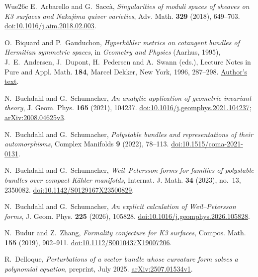\begin{thebibliography}{Wue26c}
E.~Arbarello and G.~Sacc\`a,
\textit{Singularities of moduli spaces of sheaves on K3 surfaces and
Nakajima quiver varieties}, Adv. Math. \textbf{329} (2018), 649--703.
\href{https://doi.org/10.1016/j.aim.2018.02.003}{doi:10.1016/j.aim.2018.02.003}.

O.~Biquard and P.~Gauduchon,
\textit{Hyperk\"ahler metrics on cotangent bundles of Hermitian symmetric spaces},
in \textit{Geometry and Physics} (Aarhus, 1995),
J.~E.~Andersen, J.~Dupont, H.~Pedersen and A.~Swann (eds.),
Lecture Notes in Pure and Appl. Math. \textbf{184},
Marcel Dekker, New York, 1996, 287--298.
\href{https://webusers.imj-prg.fr/~olivier.biquard/hs.pdf}{Author's text}.

N.~Buchdahl and G.~Schumacher,
\textit{An analytic application of geometric invariant theory},
J. Geom. Phys. \textbf{165} (2021), 104237.
\href{https://doi.org/10.1016/j.geomphys.2021.104237}{doi:10.1016/j.geomphys.2021.104237};
\href{https://arxiv.org/abs/2008.04625v3}{arXiv:2008.04625v3}.

N.~Buchdahl and G.~Schumacher,
\textit{Polystable bundles and representations of their automorphisms},
Complex Manifolds \textbf{9} (2022), 78--113.
\href{https://doi.org/10.1515/coma-2021-0131}{doi:10.1515/coma-2021-0131}.

N.~Buchdahl and G.~Schumacher,
\textit{Weil--Petersson forms for families of polystable bundles over
compact K\"ahler manifolds},
Internat. J. Math. \textbf{34} (2023), no.~13, 2350082.
\href{https://doi.org/10.1142/S0129167X23500829}{doi:10.1142/S0129167X23500829}.

N.~Buchdahl and G.~Schumacher,
\textit{An explicit calculation of Weil--Petersson forms},
J. Geom. Phys. \textbf{225} (2026), 105828.
\href{https://doi.org/10.1016/j.geomphys.2026.105828}{doi:10.1016/j.geomphys.2026.105828}.

N.~Budur and Z.~Zhang, \textit{Formality conjecture for K3 surfaces},
Compos. Math. \textbf{155} (2019), 902--911.
\href{https://doi.org/10.1112/S0010437X19007206}{doi:10.1112/S0010437X19007206}.

R.~Delloque, \textit{Perturbations of a vector bundle whose curvature form
solves a polynomial equation}, preprint, July 2025.
\href{https://arxiv.org/abs/2507.01534v1}{arXiv:2507.01534v1}.


\end{thebibliography}
